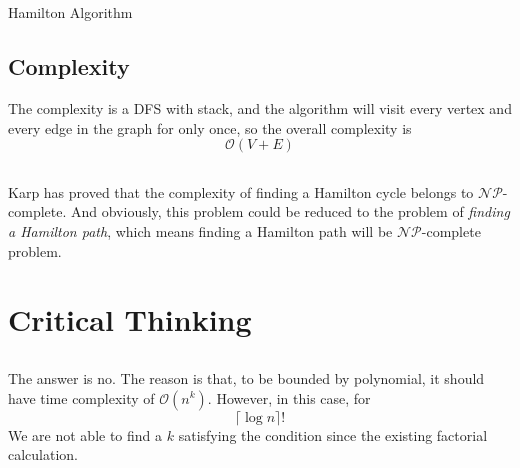 \documentclass[A4paper]{article}
\begin{document}
\subsection{}
\begin{algorithm}
\caption{Hamilton Algorithm}
\end{algorithm}
\newpage
\begin{flushleft}
\subsection{Complexity}
The complexity is a DFS with stack, and the algorithm will visit every vertex and every edge in the graph for only once, so the overall complexity is
\[
 	\mathcal{O}(V+E)
 \]
\end{flushleft}
\subsection{}
Karp has proved that the complexity of finding a Hamilton cycle belongs to $\mathcal{NP}$-complete. And obviously, this problem could be reduced to the problem of \textit{finding a Hamilton path}, which means finding a Hamilton path will be $\mathcal{NP}$-complete problem.

\section{Critical Thinking}
\subsection{}
The answer is no. The reason is that, to be bounded by polynomial, it should have time complexity of $\mathcal{O}(n^k)$. However, in this case, for\[
	\lceil \log n \rceil !
\]
We are not able to find a $k$ satisfying the condition since the existing factorial calculation.
\end{document}
